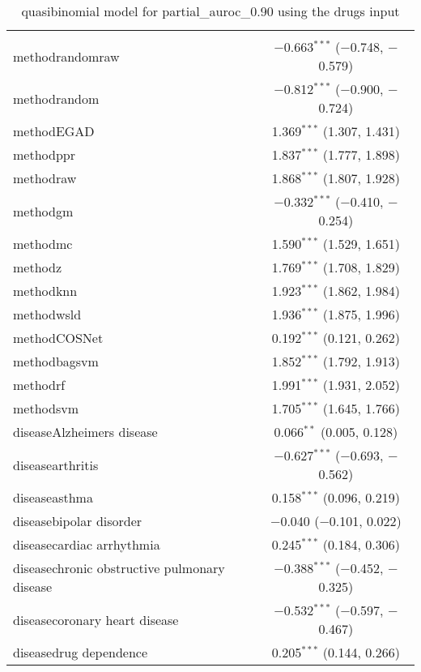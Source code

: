 
\begin{table}[!htbp] \centering 
  \caption{quasibinomial model for partial_auroc_0.90 using the drugs input} 
  \label{} 
\begin{tabular}{@{\extracolsep{5pt}}lc} 
\\[-1.8ex]\hline 
\hline \\[-1.8ex] 
 methodrandomraw & $-$0.663$^{***}$ ($-$0.748, $-$0.579) \\ 
  methodrandom & $-$0.812$^{***}$ ($-$0.900, $-$0.724) \\ 
  methodEGAD & 1.369$^{***}$ (1.307, 1.431) \\ 
  methodppr & 1.837$^{***}$ (1.777, 1.898) \\ 
  methodraw & 1.868$^{***}$ (1.807, 1.928) \\ 
  methodgm & $-$0.332$^{***}$ ($-$0.410, $-$0.254) \\ 
  methodmc & 1.590$^{***}$ (1.529, 1.651) \\ 
  methodz & 1.769$^{***}$ (1.708, 1.829) \\ 
  methodknn & 1.923$^{***}$ (1.862, 1.984) \\ 
  methodwsld & 1.936$^{***}$ (1.875, 1.996) \\ 
  methodCOSNet & 0.192$^{***}$ (0.121, 0.262) \\ 
  methodbagsvm & 1.852$^{***}$ (1.792, 1.913) \\ 
  methodrf & 1.991$^{***}$ (1.931, 2.052) \\ 
  methodsvm & 1.705$^{***}$ (1.645, 1.766) \\ 
  diseaseAlzheimers disease & 0.066$^{**}$ (0.005, 0.128) \\ 
  diseasearthritis & $-$0.627$^{***}$ ($-$0.693, $-$0.562) \\ 
  diseaseasthma & 0.158$^{***}$ (0.096, 0.219) \\ 
  diseasebipolar disorder & $-$0.040 ($-$0.101, 0.022) \\ 
  diseasecardiac arrhythmia & 0.245$^{***}$ (0.184, 0.306) \\ 
  diseasechronic obstructive pulmonary disease & $-$0.388$^{***}$ ($-$0.452, $-$0.325) \\ 
  diseasecoronary heart disease & $-$0.532$^{***}$ ($-$0.597, $-$0.467) \\ 
  diseasedrug dependence & 0.205$^{***}$ (0.144, 0.266) \\ 

\end{tabular}
\end{table}
